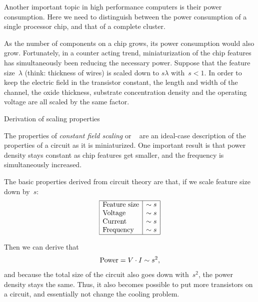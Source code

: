 
Another important topic in high performance computers is their power
consumption. Here
we need to distinguish between the power consumption of a single
processor chip, and that of a complete cluster.

As the number of components on a chip grows, its power consumption
would also grow. Fortunately, in a counter acting trend,
miniaturization of the chip features has simultaneously been reducing
the necessary power. Suppose that the feature size~$\lambda$ (think:
thickness of wires) is scaled down to $s\lambda$ with~$s<1$. In order
to keep the electric field in the transistor constant, the length and
width of the channel, the oxide thickness, substrate concentration
density and the operating voltage are all scaled by the same factor.

 {Derivation of scaling properties}

The properties of \emph{constant field scaling} or
~\cite{Bohr:30yearDennard,Dennard:scaling}
are an ideal-case description of the properties of a circuit
as it is miniaturized. One important result is that power density 
stays constant as chip features get smaller, and the frequency 
is simultaneously increased. 

The basic properties derived from circuit theory are that,
if we scale feature size down by~$s$:
\[
\begin{array}{|l|c|}\hline
\hbox{Feature size}&\sim s\\
\hbox{Voltage}&\sim s\\
\hbox{Current}&\sim s \\ 
\hbox{Frequency}&\sim s\\
\hline
\end{array}
\]

Then we can derive that 
\[ \hbox{Power} = V\cdot I \sim s^2, \]
and because the total size of the circuit also goes down with~$s^2$,
the power density stays the same.
Thus, it also becomes possible to
put more transistors on a circuit, and essentially not change the cooling
problem.

